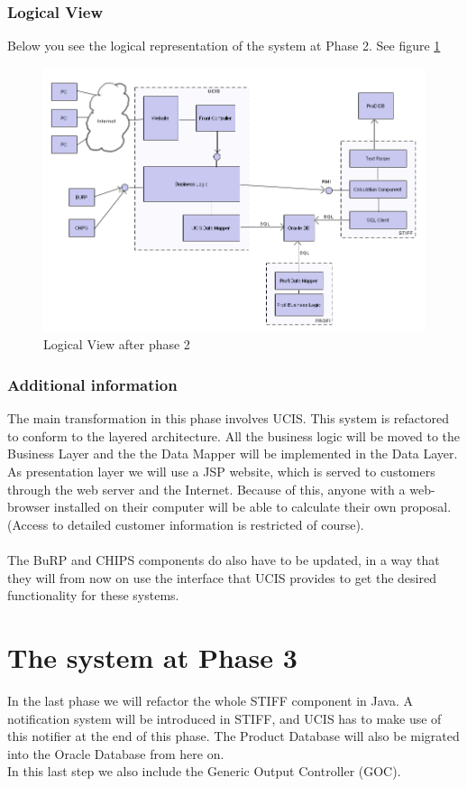 \subsubsection{Logical View}
Below you see the logical representation of the system at Phase 2. See figure \ref{fig:logical_phase2}
\begin{figure}[ht]
	\centering
		\includegraphics[width=1.00\textwidth]{img/logical-phase2.png}
	\caption{Logical View after phase 2}
	\label{fig:logical_phase2}
\end{figure}


\subsubsection{Additional information}
The main transformation in this phase involves UCIS. This system is refactored to conform to the
layered architecture. All the business logic will be moved to the Business Layer and the the 
Data Mapper will be implemented in the Data Layer. As presentation layer we will use a JSP 
website, which is served to customers through the web server and the Internet. Because of this,
anyone with a web-browser installed on their computer will be able to calculate their own 
proposal. (Access to detailed customer information is restricted of course).\\ 
 \\
The BuRP and CHIPS components do also have to be updated, in a way that they will from now on
use the interface that UCIS provides to get the desired functionality for these systems.



\section{The system at Phase 3}
In the last phase we will refactor the whole STIFF component in Java. A notification system
will be introduced in STIFF, and UCIS has to make use of this notifier at the end of this
phase. The Product Database will also be migrated into the Oracle Database from here on.\\
In this last step we also include the Generic Output Controller (GOC).

